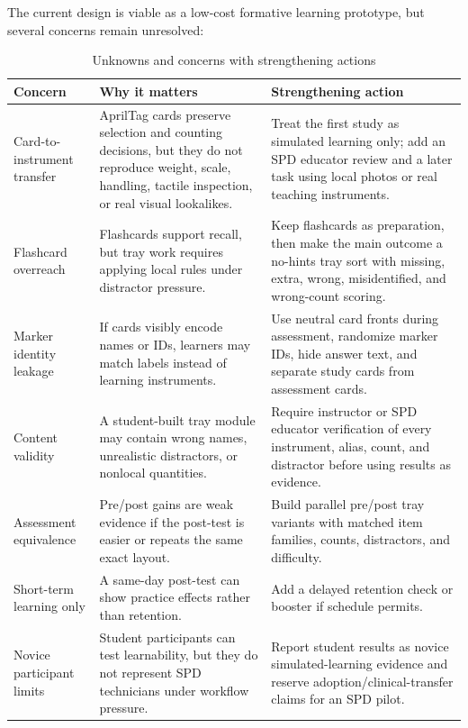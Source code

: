 \documentclass[10pt,a4paper]{article}
\begin{document}
The current design is viable as a low-cost formative learning prototype, but
several concerns remain unresolved:
\begin{table}[H]
\centering
\caption{Unknowns and concerns with strengthening actions}
\label{tab:unknowns-and-concerns-with-strengthening-actions}
\small\renewcommand{\arraystretch}{1.2}\setlength{\tabcolsep}{4pt}
\begin{tabularx}{\textwidth}{|>{\raggedright\arraybackslash}X|>{\raggedright\arraybackslash}X|>{\raggedright\arraybackslash}X|}
\hline
Concern & Why it matters & Strengthening action \\
\hline
Card-to-instrument transfer & AprilTag cards preserve selection and counting decisions, but they do not reproduce weight, scale, handling, tactile inspection, or real visual lookalikes. & Treat the first study as simulated learning only; add an SPD educator review and a later task using local photos or real teaching instruments. \\
\hline
Flashcard overreach & Flashcards support recall, but tray work requires applying local rules under distractor pressure. & Keep flashcards as preparation, then make the main outcome a no-hints tray sort with missing, extra, wrong, misidentified, and wrong-count scoring. \\
\hline
Marker identity leakage & If cards visibly encode names or IDs, learners may match labels instead of learning instruments. & Use neutral card fronts during assessment, randomize marker IDs, hide answer text, and separate study cards from assessment cards. \\
\hline
Content validity & A student-built tray module may contain wrong names, unrealistic distractors, or nonlocal quantities. & Require instructor or SPD educator verification of every instrument, alias, count, and distractor before using results as evidence. \\
\hline
Assessment equivalence & Pre/post gains are weak evidence if the post-test is easier or repeats the same exact layout. & Build parallel pre/post tray variants with matched item families, counts, distractors, and difficulty. \\
\hline
Short-term learning only & A same-day post-test can show practice effects rather than retention. & Add a delayed retention check or booster if schedule permits. \\
\hline
Novice participant limits & Student participants can test learnability, but they do not represent SPD technicians under workflow pressure. & Report student results as novice simulated-learning evidence and reserve adoption/clinical-transfer claims for an SPD pilot. \\

\end{tabularx}
\end{table}
\end{document}
